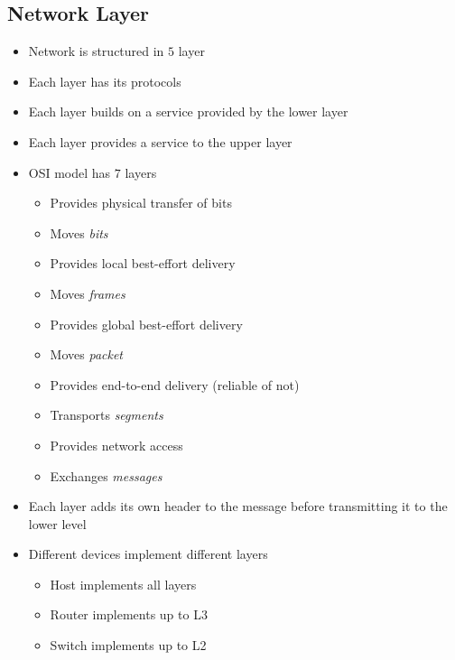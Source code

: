 \subsection{Network Layer}
\begin{itemize}
    \item Network is structured in $5$ layer
    \item Each layer has its protocols
    \item Each layer builds on a service provided by the lower layer
    \item Each layer provides a service to the upper layer
    \item OSI model has $7$ layers
        \begin{itemize}
            \item Provides physical transfer of bits
            \item Moves \textit{bits}
        \end{itemize}
        \begin{itemize}
            \item Provides local best-effort delivery
            \item Moves \textit{frames}
        \end{itemize}
        \begin{itemize}
            \item Provides global best-effort delivery
            \item Moves \textit{packet}
        \end{itemize}
        \begin{itemize}
            \item Provides end-to-end delivery (reliable of not)
            \item Transports \textit{segments}
        \end{itemize}
        \begin{itemize}
            \item Provides network access
            \item Exchanges \textit{messages}
        \end{itemize}
    \item Each layer adds its own header to the message before transmitting it to the lower level
    \item Different devices implement different layers
        \begin{itemize}
            \item Host implements all layers
            \item Router implements up to L3
            \item Switch implements up to L2
        \end{itemize}
\end{itemize}

